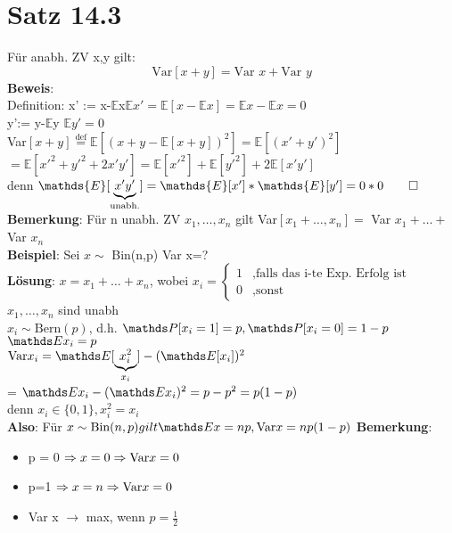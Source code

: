 \section{Satz 14.3}
Für anabh. ZV x,y gilt:
$$\text{Var}[x+y] = \text{Var }x+\text{Var }y$$
\textbf{Beweis}:\\
Definition: x' := x-$ \mathds{E} $x\hspace{1cm}$\mathds{E}x'=\mathds{E}[x-\mathds{E}x] = \mathds{E}x-\mathds{E}x=0$\medskip\\
y':= y-$\mathds{E}$y \hspace{1cm} $\mathds{E}y'=0$\medskip\\
Var$[x+y] \overset{\text{def}}{=} \mathds{E}[(x+y-\mathds{E}[x+y])^2] = \mathds{E}[(x'+y')^2]$\smallskip\\
$=\mathds{E}[x'^2+y'^2+2x'y'] = \mathds{E}[x'^2] + \mathds{E}[y'^2]+2\mathds{E}[x'y']$\medskip\\
denn $\mathds{E}[\underbrace{x'y'}_\text{unabh.}]=\mathds{E}[x']*\mathds{E}[y']=0*0\qed$\medskip\\
\textbf{Bemerkung}: Für n unabh. ZV $x_1,\dots,x_n$ gilt Var$[x_1+\dots,x_n] = $ Var $x_1+\dots + $Var $x_n$\medskip\\
\textbf{Beispiel}: Sei $x \sim $ Bin(n,p) \hspace{1cm} Var x=?\smallskip\\
\textbf{Lösung}: $ x=x_1+\dots+x_n$,  wobei $x_i=\begin{cases}
1&,\text{falls das i-te Exp. Erfolg ist}\\
0&,\text{sonst}
\end{cases}$\smallskip\\
$x_1,\dots,x_n$ sind unabh\\
$x_i \sim \text{Bern}(p)$, d.h. $\PP[x_i = 1]=p, \PP[x_i=0]=1-p$\\
$\E x_i=p$\\
$\var x_i = \E[\underbrace{x_i^2}_{x_i}]-(\E[x_i])^2$\\ = $\E x_i - (\E x_i)^2=p-p^2 = p(1-p)$\medskip\\
denn $x_i \in \{0,1\}, x_i^2=x_i$\medskip\\
\textbf{Also}: Für $x \sim \text{Bin}(n,p) gilt \E x = np, \var x = np(1-p)$\newpage
\textbf{Bemerkung}:
\begin{itemize}
	\item  p = 0 $\Rightarrow x=0 \Rightarrow \text{Var} x = 0$
	\item p=1 $\Rightarrow x=n \Rightarrow \text{Var} x = 0$
	\item Var x $\rightarrow$ max, wenn $p=\frac{1}{2}$
\end{itemize}
